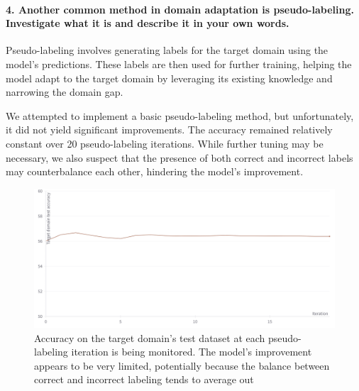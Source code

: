 \paragraph*{4. Another common method in domain adaptation is pseudo-labeling. Investigate what it is and describe it in your own words.}

Pseudo-labeling involves generating labels for the target domain using the model's predictions. These labels are then used for further training, helping the model adapt to the target domain by leveraging its existing knowledge and narrowing the domain gap.

We attempted to implement a basic pseudo-labeling method, but unfortunately, it did not yield significant improvements. The accuracy remained relatively constant over 20 pseudo-labeling iterations. While further tuning may be necessary, we also suspect that the presence of both correct and incorrect labels may counterbalance each other, hindering the model's improvement.

\begin{figure}[htbp]
    \centering
    \includegraphics[width=.8\textwidth]{pseudo_labeling.png}
    \caption{Accuracy on the target domain's test dataset at each pseudo-labeling iteration is being monitored. The model's improvement appears to be very limited, potentially because the balance between correct and incorrect labeling tends to average out}
    \label{fig:pseudo_labeling}
\end{figure}


